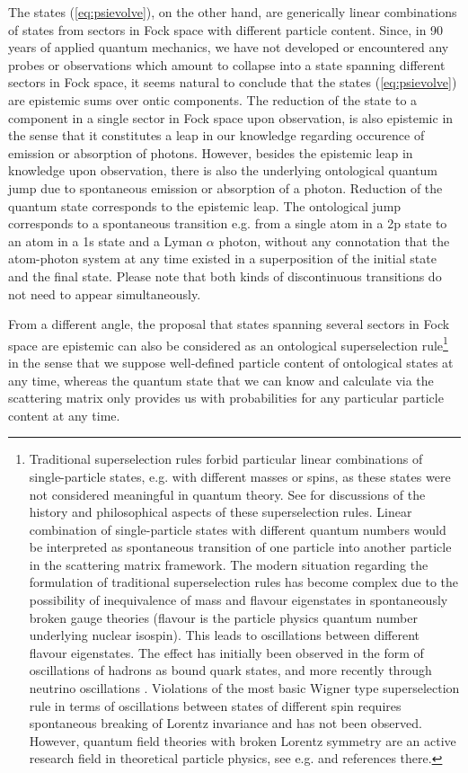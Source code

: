 \documentclass[final,3p,12pt]{elsarticle3}
\begin{document}
The states (\ref{eq:psievolve}), on the other hand, are generically linear
combinations of states from sectors in Fock space with different particle content.
Since, in 90 years of applied quantum mechanics,
we have not developed or encountered any probes or observations which amount to
collapse into a state spanning different sectors in Fock space, it seems natural
to conclude that the states (\ref{eq:psievolve}) are epistemic sums over
ontic components. The reduction of the state to a component in a single sector
in Fock space upon observation, is also epistemic in the sense that it constitutes 
a leap in our knowledge regarding occurence of emission or absorption of photons. 
However, besides the epistemic leap in knowledge upon observation, there is also 
the underlying ontological quantum jump due to spontaneous emission or absorption 
of a photon. Reduction of the quantum state corresponds to the epistemic leap. The 
ontological jump corresponds to a spontaneous transition e.g. from a single atom
in a 2p state to an atom in a 1s state and a Lyman $\alpha$ photon, without
any connotation that the atom-photon system at any time existed in a
superposition of the initial state and the final state. Please note that
both kinds of discontinuous transitions do not need to appear simultaneously.

 From a different angle, the proposal that states spanning several sectors 
in Fock space are epistemic can also be considered as an ontological 
superselection rule\footnote{Traditional superselection rules forbid
particular linear combinations of single-particle states, e.g. with different 
masses or spins, as these states were not considered meaningful in quantum theory. 
See \cite{earman,ruetsche} for discussions of the history and philosophical aspects 
of these superselection rules. Linear combination of single-particle states 
with different quantum numbers would be
interpreted as spontaneous transition of one particle into another
particle in the scattering matrix framework. 
The modern situation regarding the formulation of traditional 
superselection rules has become complex due to the possibility
of inequivalence of mass and flavour eigenstates in spontaneously broken
gauge theories (flavour is the particle physics quantum number underlying 
nuclear isospin). This leads to oscillations between different flavour
eigenstates. The effect has initially been observed in the form of 
oscillations of hadrons as bound quark states, and more recently
through neutrino oscillations \cite{sk,sno}. Violations of the 
most basic Wigner type superselection rule in terms of oscillations
between states of different spin requires spontaneous breaking
of Lorentz invariance and has not been observed. However, quantum field
theories with broken Lorentz symmetry are an active research field 
in theoretical particle physics, see e.g. \cite{lsb1,lsb2} 
and references there.} 
in the sense that we suppose well-defined particle
content of ontological states at any time, whereas the quantum state 
that we can know and calculate via the scattering matrix only provides
us with probabilities for any particular particle content at any time.
\end{document}
